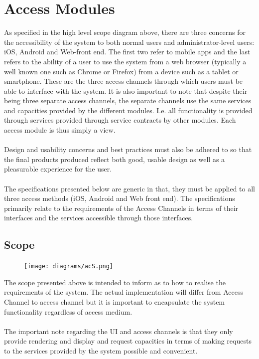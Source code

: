 \documentclass[12pt]{article}
\begin{document}
\section{Access Modules}
As specified in the high level scope diagram above, there are three concerns for the accessibility of the system to both normal users and administrator-level users: iOS, Android and Web-front end. The first two refer to mobile apps and the last refers to the ability of a user to use the system from a web browser (typically a well known one such as Chrome or Firefox) from a device such as a tablet or smartphone. These are the three access channels through which users must be able to interface with the system. It is also important to note that despite their being three separate access channels, the separate channels use the same services and capacities provided by the different modules. I.e. all functionality is provided through services provided through service contracts by other modules. Each access module is thus simply a view.  
\\\\
Design and usability concerns and best practices must also be adhered to so that the final products produced reflect both good, usable design as well as a pleasurable experience for the user.
\\\\
The specifications presented below are generic in that, they must be applied to all three access methods (iOS, Android and Web front end). The specifications primarily relate to the requirements of the Access Channels in terms of their interfaces and the services accessible through those interfaces.

\subsection{Scope}
\begin{figure}[h]
\centering
\texttt{[image: diagrams/acS.png]}

\end{figure}
The scope presented above is intended to inform as to how to realise the requirements of the system. The actual implementation will differ from Access Channel to access channel but it is important to encapsulate the system functionality regardless of access medium.
\\\\
The important note regarding the UI and access channels is that they only provide rendering and display and request capacities in terms of making requests to the services provided by the system possible and convenient.
\end{document}
